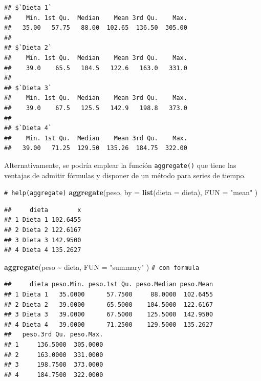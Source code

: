 \documentclass[
]{book}
\newenvironment{Shaded}{\begin{snugshade}}{\end{snugshade}}
\newcommand{\AttributeTok}[1]{\textcolor[rgb]{0.13,0.29,0.53}{#1}}
\newcommand{\CommentTok}[1]{\textcolor[rgb]{0.56,0.35,0.01}{\textit{#1}}}
\newcommand{\FunctionTok}[1]{\textcolor[rgb]{0.13,0.29,0.53}{\textbf{#1}}}
\newcommand{\NormalTok}[1]{#1}
\newcommand{\SpecialCharTok}[1]{\textcolor[rgb]{0.81,0.36,0.00}{\textbf{#1}}}
\newcommand{\StringTok}[1]{\textcolor[rgb]{0.31,0.60,0.02}{#1}}
\theoremstyle{break}
\theoremstyle{nonumberplain}
\renewcommand{\CommentTok}[1]{\textcolor[rgb]{0.41,0.41,0.41}{\texttt{#1}}}
\begin{document}
\begin{verbatim}
## $`Dieta 1`
##    Min. 1st Qu.  Median    Mean 3rd Qu.    Max. 
##   35.00   57.75   88.00  102.65  136.50  305.00 
## 
## $`Dieta 2`
##    Min. 1st Qu.  Median    Mean 3rd Qu.    Max. 
##    39.0    65.5   104.5   122.6   163.0   331.0 
## 
## $`Dieta 3`
##    Min. 1st Qu.  Median    Mean 3rd Qu.    Max. 
##    39.0    67.5   125.5   142.9   198.8   373.0 
## 
## $`Dieta 4`
##    Min. 1st Qu.  Median    Mean 3rd Qu.    Max. 
##   39.00   71.25  129.50  135.26  184.75  322.00
\end{verbatim}

Alternativamente, se podría emplear la función \texttt{aggregate()} que tiene las ventajas de admitir fórmulas y disponer de un método para series de tiempo.

\begin{Shaded}
\begin{Highlighting}[]
\CommentTok{\# help(aggregate)}
\FunctionTok{aggregate}\NormalTok{(peso, }\AttributeTok{by =} \FunctionTok{list}\NormalTok{(}\AttributeTok{dieta =}\NormalTok{ dieta), }\AttributeTok{FUN =} \StringTok{"mean"}\NormalTok{ )}
\end{Highlighting}
\end{Shaded}

\begin{verbatim}
##     dieta        x
## 1 Dieta 1 102.6455
## 2 Dieta 2 122.6167
## 3 Dieta 3 142.9500
## 4 Dieta 4 135.2627
\end{verbatim}

\begin{Shaded}
\begin{Highlighting}[]
\FunctionTok{aggregate}\NormalTok{(peso }\SpecialCharTok{\textasciitilde{}}\NormalTok{ dieta, }\AttributeTok{FUN =} \StringTok{"summary"}\NormalTok{ ) }\CommentTok{\# con formula}
\end{Highlighting}
\end{Shaded}

\begin{verbatim}
##     dieta peso.Min. peso.1st Qu. peso.Median peso.Mean
## 1 Dieta 1   35.0000      57.7500     88.0000  102.6455
## 2 Dieta 2   39.0000      65.5000    104.5000  122.6167
## 3 Dieta 3   39.0000      67.5000    125.5000  142.9500
## 4 Dieta 4   39.0000      71.2500    129.5000  135.2627
##   peso.3rd Qu. peso.Max.
## 1     136.5000  305.0000
## 2     163.0000  331.0000
## 3     198.7500  373.0000
## 4     184.7500  322.0000
\end{verbatim}
\end{document}
